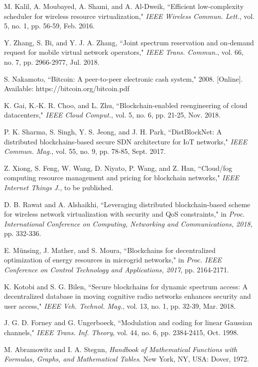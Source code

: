 \documentclass[journal]{IEEEtran}
\begin{document}
\begin{thebibliography}{1}
 M. Kalil, A. Moubayed, A. Shami, and A. Al-Dweik, ``Efficient low-complexity scheduler for wireless resource virtualization," \emph{IEEE Wireless Commun. Lett.}, vol. 5, no. 1, pp. 56-59, Feb. 2016.
	
 Y. Zhang, S. Bi, and Y. J. A. Zhang, ``Joint spectrum reservation and on-demand request for mobile virtual network operators," \emph{IEEE Trans. Commun.}, vol. 66, no. 7, pp. 2966-2977, Jul. 2018.

 S. Nakamoto, ``Bitcoin: A peer-to-peer electronic cash system," 2008. [Online]. Available: https://bitcoin.org/bitcoin.pdf

 K. Gai, K.-K. R. Choo, and L. Zhu, ``Blockchain-enabled reengineering of cloud datacenters," \emph{IEEE Cloud Comput.}, vol. 5, no. 6, pp. 21-25, Nov. 2018.

 P. K. Sharma, S. Singh, Y. S. Jeong, and J. H. Park, ``DistBlockNet: A distributed blockchains-based secure SDN architecture for IoT networks," \emph{IEEE Commun. Mag.}, vol. 55, no. 9, pp. 78-85, Sept. 2017.

 Z. Xiong, S. Feng, W. Wang, D. Niyato, P. Wang, and Z. Han, ``Cloud/fog computing resource management and pricing for blockchain networks," \emph{IEEE Internet Things J.}, to be published.

 D. B. Rawat and A. Alshaikhi, ``Leveraging distributed blockchain-based scheme for wireless network virtualization with security and QoS constraints," in \emph{Proc. International Conference on Computing, Networking and Communications, 2018}, pp. 332-336.

 E. M\"{u}nsing, J. Mather, and S. Moura, ``Blockchains for decentralized optimization of energy resources in microgrid networks," in \emph{Proc. IEEE Conference on Control Technology and Applications, 2017}, pp. 2164-2171.

 K. Kotobi and S. G. Bilen, ``Secure blockchains for dynamic spectrum access: A decentralized database in moving cognitive radio networks enhances security and user access," \emph{IEEE Veh. Technol. Mag.}, vol. 13, no. 1, pp. 32-39, Mar. 2018.
	
 J. G. D. Forney and G. Ungerboeck, ``Modulation and coding for linear Gaussian channels," \emph{IEEE Trans. Inf. Theory}, vol. 44, no. 6, pp. 2384-2415, Oct. 1998.

 M. Abramowitz and I. A. Stegun, \emph{Handbook of Mathematical Functions with Formulas, Graphs, and Mathematical Tables}. New York, NY, USA: Dover, 1972.


\end{thebibliography}
\end{document}

